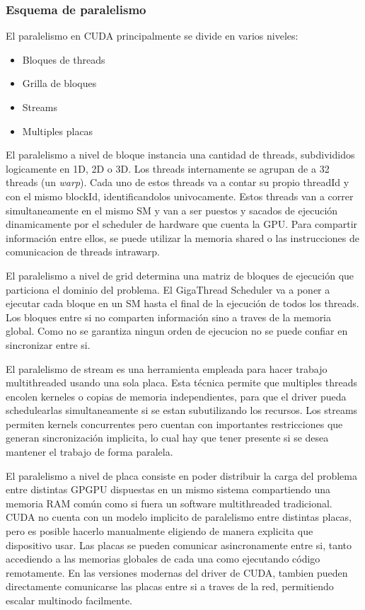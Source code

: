 \subsubsection{Esquema de paralelismo}
El paralelismo en CUDA principalmente se divide en varios niveles:
\begin{itemize}
  \item Bloques de threads
  \item Grilla de bloques
  \item Streams
  \item Multiples placas
\end{itemize}

El paralelismo a nivel de bloque instancia una cantidad de threads, subdivididos logicamente en 1D, 2D o 3D.
Los threads internamente se agrupan de a 32 threads (un \textit{warp}).
Cada uno de estos threads va a contar su propio threadId y con el mismo blockId, identificandolos univocamente.
Estos threads van a correr simultaneamente en el mismo SM y van a ser puestos y sacados de ejecuci\'on
dinamicamente por el scheduler de hardware que cuenta la GPU. Para compartir informaci\'on entre
ellos, se puede utilizar la memoria shared o las instrucciones de comunicacion de threads intrawarp.

El paralelismo a nivel de grid determina una matriz de bloques de ejecuci\'on que particiona
el dominio del problema. El GigaThread Scheduler va a poner a ejecutar cada bloque en un SM hasta
el final de la ejecuci\'on de todos los threads. Los bloques entre si no comparten informaci\'on
sino a traves de la memoria global. Como no se garantiza ningun orden de ejecucion no se puede
confiar en sincronizar entre si.

El paralelismo de stream es una herramienta empleada para hacer trabajo multithreaded usando una
sola placa. Esta t\'ecnica permite que multiples threads encolen kerneles o copias de memoria
independientes, para que el driver pueda schedulearlas simultaneamente si se estan subutilizando
los recursos. Los streams permiten kernels concurrentes pero cuentan con importantes restricciones
que generan sincronizaci\'on implicita, lo cual hay que tener presente si se desea mantener el trabajo
de forma paralela.

El paralelismo a nivel de placa consiste en poder distribuir la carga del problema entre distintas
GPGPU dispuestas en un mismo sistema compartiendo una memoria RAM com\'un como si fuera un software
multithreaded tradicional. CUDA no cuenta con un modelo implicito de paralelismo entre distintas placas,
pero es posible hacerlo manualmente eligiendo de manera explicita que dispositivo usar. Las placas
se pueden comunicar asincronamente entre si, tanto accediendo a las memorias globales de cada una
como ejecutando c\'odigo remotamente. En las versiones modernas del driver de CUDA, tambien pueden
directamente comunicarse las placas entre si a traves de la red, permitiendo escalar multinodo facilmente.

